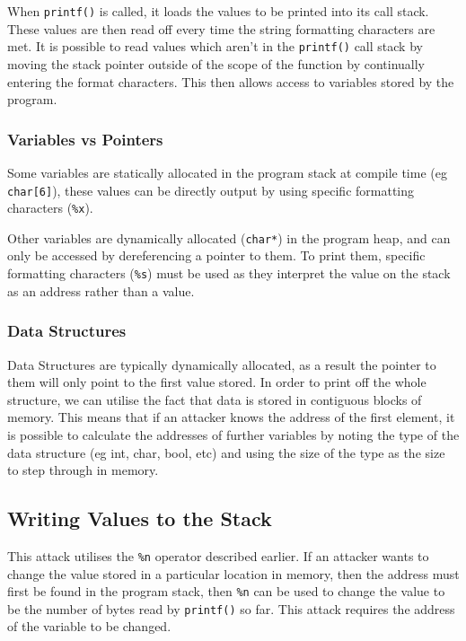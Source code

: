 \documentclass[11pt]{article}
\begin{document}
When \texttt{printf()} is called, it loads the values to be printed into its
call stack. These values are then read off every time the string
formatting characters are met. It is possible to read values which
aren't in the \texttt{printf()} call stack by moving the stack pointer outside
of the scope of the function by continually entering the format
characters. This then allows access to variables stored by the
program.

\subsubsection{Variables vs Pointers}
\label{sec:org861a0a3}

Some variables are statically allocated in the program stack at
compile time (eg \texttt{char[6]}), these values can be directly
output by using specific formatting characters (\texttt{\%x}).

Other variables are dynamically allocated (\texttt{char*}) in the program heap, and
can only be accessed by dereferencing a pointer to them. To print
them, specific formatting characters (\texttt{\%s}) must be used as they interpret
the value on the stack as an address rather than a value.

\subsubsection{Data Structures}
\label{sec:org21da245}

Data Structures are typically dynamically allocated, as a result the
pointer to them will only point to the first value stored. In order to
print off the whole structure, we can utilise the fact that data is
stored in contiguous blocks of memory. This means that if an attacker
knows the address of the first element, it is possible to calculate
the addresses of further variables by noting the type of the data
structure (eg int, char, bool, etc) and using the size of the type as
the size to step through in memory.

\subsection{Writing Values to the Stack}
\label{sec:orge4c0fd5}

This attack utilises the \texttt{\%n} operator described earlier. If an
attacker wants to change the value stored in a particular location in
memory, then the address must first be found in the program stack,
then \texttt{\%n} can be used to change the value to be the number of bytes
read by \texttt{printf()} so far. This attack requires the address of the
variable to be changed.
\end{document}
